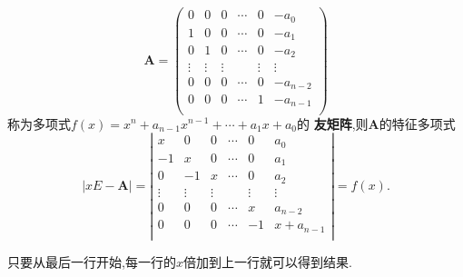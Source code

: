 \documentclass[lang=cn,newtx,10pt,scheme=chinese]{elegantbook}
\begin{document}
\begin{proposition}\label{pro:友矩阵的特征多项式/行列式}
    \begin{equation}
        \boldsymbol{A}=\left( \begin{matrix}
            0&		0&		0&		\cdots&		0&		-a_0\\
            1&		0&		0&		\cdots&		0&		-a_1\\
            0&		1&		0&		\cdots&		0&		-a_2\\
            \vdots&		\vdots&		\vdots&		&		\vdots&		\vdots\\
            0&		0&		0&		\cdots&		0&		-a_{n-2}\\
            0&		0&		0&		\cdots&		1&		-a_{n-1}\\
        \end{matrix} \right) 
        \nonumber
    \end{equation}
        称为多项式$f\left( x \right) =x^n+a_{n-1}x^{n-1}+\cdots +a_1x+a_0$的
        \textbf{友矩阵},则$\boldsymbol{A}$的特征多项式
        \begin{equation}
            |xE-\boldsymbol{A}|=\left| \begin{matrix}
                x&		0&		0&		\cdots&		0&		a_0\\
                -1&		x&		0&		\cdots&		0&		a_1\\
                0&		-1&		x&		\cdots&		0&		a_2\\
                \vdots&		\vdots&		\vdots&		&		\vdots&		\vdots\\
                0&		0&		0&		\cdots&		x&		a_{n-2}\\
                0&		0&		0&		\cdots&		-1&		x+a_{n-1}\\
            \end{matrix} \right|=f(x).
            \nonumber
        \end{equation}
\end{proposition}
\begin{note}
只要从最后一行开始,每一行的$x$倍加到上一行就可以得到结果.
\end{note}
\end{document}
